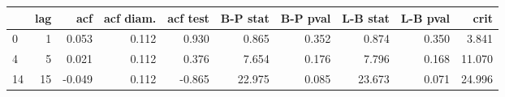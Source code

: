 \begin{tabular}{lrrrrrrrrr}
\toprule
{} &  lag &    acf &  acf diam. &  acf test &  B-P stat &  B-P pval &  L-B stat &  L-B pval &    crit \\
\midrule
0  &    1 &  0.053 &      0.112 &     0.930 &     0.865 &     0.352 &     0.874 &     0.350 &   3.841 \\
4  &    5 &  0.021 &      0.112 &     0.376 &     7.654 &     0.176 &     7.796 &     0.168 &  11.070 \\
14 &   15 & -0.049 &      0.112 &    -0.865 &    22.975 &     0.085 &    23.673 &     0.071 &  24.996 \\
\bottomrule
\end{tabular}
